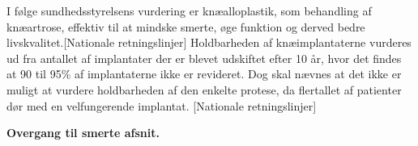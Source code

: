 I følge sundhedsstyrelsens vurdering er knæalloplastik, som behandling af knæartrose, effektiv til at mindske smerte, øge funktion og derved bedre livskvalitet.[Nationale retningslinjer] Holdbarheden af knæimplantaterne vurderes ud fra antallet af implantater der er blevet udskiftet efter 10 år, hvor det findes at 90 til 95\% af implantaterne ikke er revideret. Dog skal nævnes at det ikke er muligt at vurdere holdbarheden af den enkelte protese, da flertallet af patienter dør med en velfungerende implantat. [Nationale retningslinjer]

\textbf{Overgang til smerte afsnit.}
%
%
%
